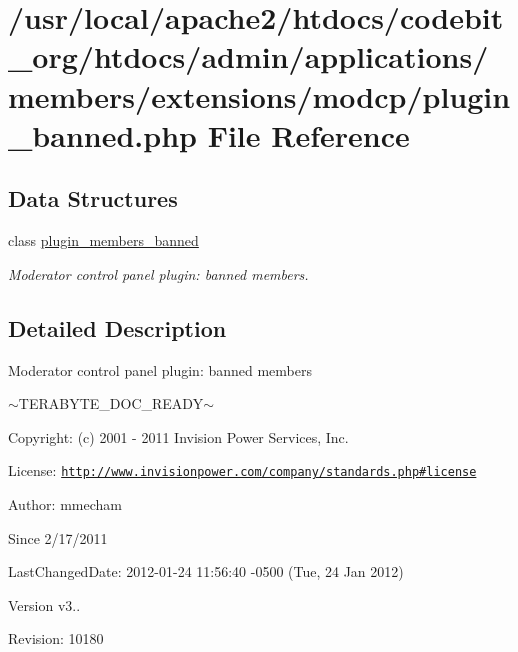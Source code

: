 \hypertarget{plugin__banned_8php}{\section{/usr/local/apache2/htdocs/codebit\-\_\-org/htdocs/admin/applications/members/extensions/modcp/plugin\-\_\-banned.php File Reference}
\label{plugin__banned_8php}
}
\subsection*{Data Structures}
\begin{DoxyCompactItemize}
\item 
class \hyperlink{classplugin__members__banned}{plugin\-\_\-members\-\_\-banned}
\begin{DoxyCompactList}\small\item\em Moderator control panel plugin\-: banned members. \end{DoxyCompactList}\end{DoxyCompactItemize}


\subsection{Detailed Description}
\begin{DoxyVerb}  Moderator control panel plugin: banned members
\end{DoxyVerb}
 $\sim$\-T\-E\-R\-A\-B\-Y\-T\-E\-\_\-\-D\-O\-C\-\_\-\-R\-E\-A\-D\-Y$\sim$ \begin{DoxyParagraph}{Copyright\-:}
(c) 2001 -\/ 2011 Invision Power Services, Inc.
\end{DoxyParagraph}
\begin{DoxyParagraph}{License\-:}
\href{http://www.invisionpower.com/company/standards.php#license}{\tt http\-://www.\-invisionpower.\-com/company/standards.\-php\#license}
\end{DoxyParagraph}
\begin{DoxyParagraph}{Author\-:}
mmecham 
\end{DoxyParagraph}
\begin{DoxySince}{Since}
2/17/2011 
\end{DoxySince}
\begin{DoxyParagraph}{Last\-Changed\-Date\-:}
2012-\/01-\/24 11\-:56\-:40 -\/0500 (Tue, 24 Jan 2012) 
\end{DoxyParagraph}
\begin{DoxyVersion}{Version}
v3.. 
\end{DoxyVersion}
\begin{DoxyParagraph}{Revision\-:}
10180 
\end{DoxyParagraph}

